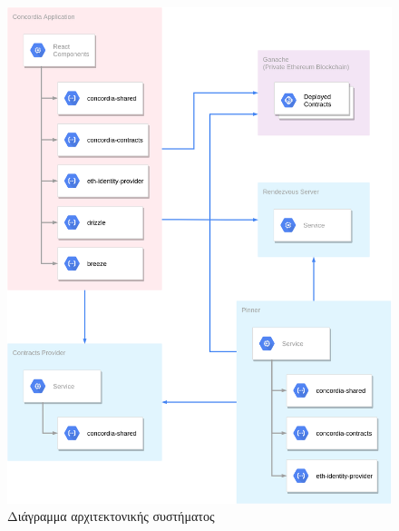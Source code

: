 \begin{figure}[H]
    \centering
    \includegraphics[width=.75\textwidth]{assets/figures/chapter-4/4.3.architecture-architecture-overview.png}
    \caption{Διάγραμμα αρχιτεκτονικής συστήματος}
    \label{figure:4-3-architecture-overview}
\end{figure}









